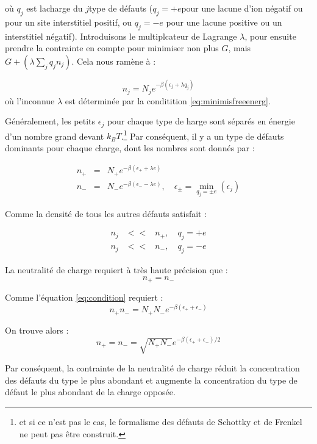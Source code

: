 où $q_j$ est lacharge du $j$\ieme type de défauts ($q_j = +e $pour une lacune d'ion négatif ou pour un site interstitiel positif, ou $q_j = -e$ pour une lacune positive ou un interstitiel négatif). Introduisons le multiplcateur de Lagrange $\lambda$, pour ensuite prendre la contrainte en compte pour minimiser non plus $G$, mais $G + (\lambda \sum_j q_j n_j)$. Cela nous ramène à :

\begin{equation}
    n_j = N_j e^{-\beta(\epsilon_j + \lambda q_j)}
\end{equation}
où l'inconnue $\lambda$ est déterminée par la conditition \ref{eq:minimisfreeenerg}.

Généralement, les petits $\epsilon_j$ pour chaque type de harge sont séparés en énergie d'un nombre grand devant $k_B T$.\footnote{et si ce n'est pas le cas, le formalisme des défauts de Schottky et de Frenkel ne peut pas être construit.} Par conséquent, il y a un type de défauts dominants pour chaque charge, dont les nombres sont donnés par :

\begin{eqnarray}
    n_+ & = & N_+ e^{-\beta(\epsilon_+ + \lambda e)}\\
    n_- & = & N_- e^{-\beta(\epsilon_- - \lambda e)}, \quad \epsilon_\pm = \min_{q_j = \pm e} (\epsilon_j)
    \label{eq:condition}
\end{eqnarray}

Comme la densité de tous les autres défauts satisfait :

\begin{eqnarray}
    n_j & << & n_+, \quad q_j = +e\\
    n_j & << & n_-, \quad q_j = -e
\end{eqnarray}

La neutralité de charge requiert à très haute précision que :
\begin{equation}
    n_+ = n_-
\end{equation}

Comme l'équation \ref{eq:condition} requiert :
\begin{equation}
    n_+ n_- = N_+ N_- e^{-\beta(\epsilon_+ + \epsilon_-)}
\end{equation}

On trouve alors :
\begin{equation}
    n_+ = n_- = \sqrt{N_+ N_-} e^{-\beta(\epsilon_+ + \epsilon_-)/2}
\end{equation}

Par conséquent, la contrainte de la neutralité de charge réduit la concentration des défauts du type le plus abondant et augmente la concentration du type de défaut le plus abondant de la charge opposée.

